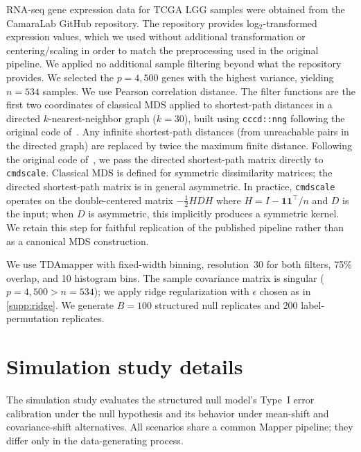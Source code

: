 \documentclass[hidelinks]{siamart251216}
\begin{document}
RNA-seq gene expression data for TCGA LGG samples were obtained from
the CamaraLab GitHub repository.  The repository provides
log$_2$-transformed expression values, which we used without additional
transformation or centering/scaling in order to match the preprocessing
used in the original pipeline.  We applied no additional sample filtering
beyond what the repository provides.  We selected the
$p = 4{,}500$ genes with the highest variance, yielding $n = 534$
samples.  We use Pearson correlation distance.  The filter functions are
the first two coordinates of classical MDS applied to shortest-path
distances in a directed $k$-nearest-neighbor graph ($k = 30$), built
using \texttt{cccd::nng} following the original code
of~\cite{RabadanCamara2020}.  Any infinite shortest-path distances
(from unreachable pairs in the directed graph) are replaced by twice the
maximum finite distance.  Following the original code
of~\cite{RabadanCamara2020}, we pass the directed shortest-path matrix
directly to \texttt{cmdscale}.  Classical MDS is defined for symmetric
dissimilarity matrices; the directed shortest-path matrix is in general
asymmetric.  In practice, \texttt{cmdscale} operates on the double-centered matrix
$-\tfrac{1}{2} H D H$ where $H = I - \mathbf{1}\mathbf{1}^\top/n$ and
$D$ is the input; when $D$ is asymmetric, this implicitly produces a
symmetric kernel.  We retain this step for faithful replication of the
published pipeline rather than as a canonical MDS construction.

We use TDAmapper with fixed-width binning, resolution~30 for both
filters, 75\% overlap, and 10 histogram bins.  The sample covariance
matrix is singular ($p = 4{,}500 > n = 534$); we apply ridge
regularization with $\epsilon$ chosen as in \cref{supp:ridge}.  We
generate $B = 100$ structured null replicates and 200 label-permutation
replicates.


\section{Simulation study details}\label{sm:simulation}

The simulation study evaluates the structured null model's Type~I error
calibration under the null hypothesis and its behavior under
mean-shift and covariance-shift alternatives.  All scenarios share a
common Mapper pipeline; they differ only in the data-generating process.
\end{document}
